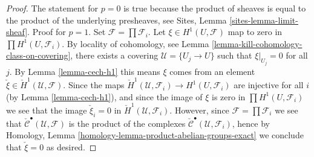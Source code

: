 \documentclass[10pt,a4paper]{amsart}
\theoremstyle{plain}
\theoremstyle{definition}
\theoremstyle{remark}
\numberwithin{equation}{subsection}
\begin{document}
\begin{proof}
The statement for $p = 0$ is true because the product of sheaves
is equal to the product of the underlying presheaves, see
Sites, Lemma \ref{sites-lemma-limit-sheaf}.
Proof for $p = 1$. Set $\mathcal{F} = \prod \mathcal{F}_i$.
Let $\xi \in H^1(U, \mathcal{F})$ map to zero in
$\prod H^1(U, \mathcal{F}_i)$. By locality of cohomology, see
Lemma \ref{lemma-kill-cohomology-class-on-covering},
there exists a covering $\mathcal{U} = \{U_j \to U\}$ such that
$\xi|_{U_j} = 0$ for all $j$. By Lemma \ref{lemma-cech-h1} this means
$\xi$ comes from an element
$\check \xi \in \check H^1(\mathcal{U}, \mathcal{F})$.
Since the maps
$\check H^1(\mathcal{U}, \mathcal{F}_i) \to H^1(U, \mathcal{F}_i)$
are injective for all $i$ (by Lemma \ref{lemma-cech-h1}), and since
the image of $\xi$ is zero in $\prod H^1(U, \mathcal{F}_i)$ we see
that the image
$\check \xi_i = 0$ in $\check H^1(\mathcal{U}, \mathcal{F}_i)$.
However, since $\mathcal{F} = \prod \mathcal{F}_i$ we see that
$\check{\mathcal{C}}^\bullet(\mathcal{U}, \mathcal{F})$ is the
product of the complexes
$\check{\mathcal{C}}^\bullet(\mathcal{U}, \mathcal{F}_i)$,
hence by
Homology, Lemma \ref{homology-lemma-product-abelian-groups-exact}
we conclude that $\check \xi = 0$ as desired.
\end{proof}
\end{document}
